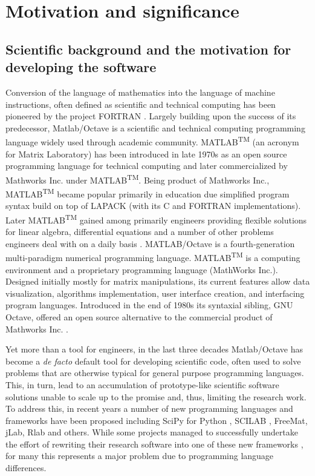 \section{Motivation and significance}
\subsection{Scientific background and the motivation for developing the software}

Conversion of the language of mathematics into the language of machine instructions, often defined as scientific and technical computing has been pioneered by the project FORTRAN \cite{Backus:1957:FAC}. Largely building upon the success of its predecessor, Matlab/Octave is a scientific and technical computing programming language widely used through academic community. MATLAB\textsuperscript{TM} (an acronym for Matrix Laboratory) has been introduced in late 1970s as an open source programming language for technical computing and later commercialized by Mathworks Inc. under MATLAB\textsuperscript{TM}. Being product of Mathworks Inc., MATLAB\textsuperscript{TM} became popular primarily in education due simplified program syntax build on top of LAPACK (with its C and FORTRAN implementations). Later MATLAB\textsuperscript{TM} gained among primarily engineers providing flexible solutions for linear algebra, differential equations and a number of other problems engineers deal with on a daily basis \cite{moore2014matlab}. MATLAB/Octave is a fourth-generation multi-paradigm numerical programming language. MATLAB\textsuperscript{TM} is a computing environment and a proprietary programming language (MathWorks Inc.). Designed initially mostly for matrix manipulations, its current features allow data visualization, algorithms implementation, user interface creation, and interfacing program languages. Introduced in the end of 1980s its syntaxial sibling, GNU Octave, offered an open source alternative to the commercial product of Mathworks Inc. \cite{eaton1997gnu}.

Yet more than a tool for engineers, in the last three decades Matlab/Octave has become a \textit{de facto} default tool for developing scientific code, often used to solve problems that are otherwise typical for general purpose programming languages. This, in turn, lead to an accumulation of prototype-like scientific software solutions unable to scale up to the promise and, thus, limiting the research work. To address this, in recent years a number of new programming languages and frameworks have been proposed including SciPy for Python \cite{jones2001open, Olivier_2002}, SCILAB \cite{Campbell_2009}, FreeMat, jLab, Rlab and others. While some projects managed to successfully undertake the effort of rewriting their research software into one of these new frameworks \cite{17076895, 21349861}, for many this represents a major problem due to programming language differences.

